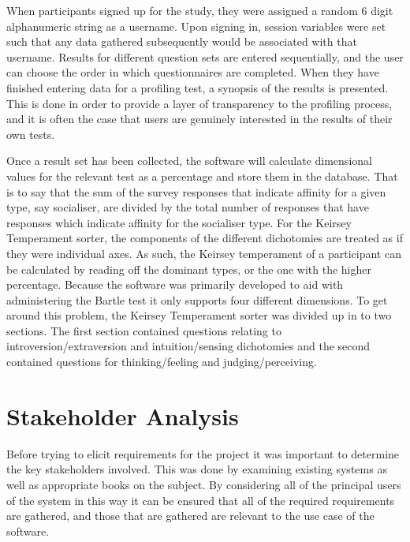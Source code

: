 \documentclass[12pt,a4paper,twoside]{report}
\begin{document}
When participants signed up for the study, they were assigned a random 6 digit alphanumeric string as a username. Upon signing in, session variables were set such that any data gathered subsequently would be associated with that username. Results for different question sets are entered sequentially, and the user can choose the order in which questionnaires are completed. When they have finished entering data for a profiling test, a synopsis of the results is presented. This is done in order to provide a layer of transparency to the profiling process, and it is often the case that users are genuinely interested in the results of their own tests.

Once a result set has been collected, the software will calculate dimensional values for the relevant test as a percentage and store them in the database. That is to say that the sum of the survey responses that indicate affinity for a given type, say socialiser, are divided by the total number of responses that have responses which indicate affinity for the socialiser type. For the Keirsey Temperament sorter, the components of the different dichotomies are treated as if they were individual axes. As such, the Keirsey temperament of a participant can be calculated by reading off the dominant types, or the one with the higher percentage. Because the software was primarily developed to aid with administering the Bartle test it only supports four different dimensions. To get around this problem, the Keirsey Temperament sorter was divided up in to two sections. The first section contained questions relating to introversion/extraversion and intuition/sensing dichotomies and the second contained questions for thinking/feeling and judging/perceiving.

\section{Stakeholder Analysis}
Before trying to elicit requirements for the project it was important to determine the key stakeholders involved. This was done by examining existing systems as well as appropriate books on the subject. By considering all of the principal users of the system in this way it can be ensured that all of the required requirements are gathered, and those that are gathered are relevant to the use case of the software.
\end{document}
